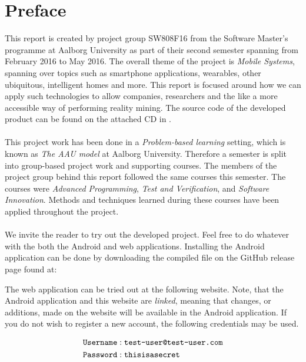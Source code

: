 
\chapter*{Preface}
This report is created by project group SW808F16 from the Software Master's programme at Aalborg University as part of their second semester spanning from February 2016 to May 2016. The overall theme of the project is \emph{Mobile Systems}, spanning over topics such as smartphone applications, wearables, other ubiquitous, intelligent homes and more. This report is focused around how we can apply such technologies to allow companies, researchers and the like a more accessible way of performing reality mining. The source code of the developed product can be found on the attached CD in .
\\\\
This project work has been done in a \emph{Problem-based learning} setting, which is known as \emph{The AAU model} at Aalborg University. Therefore a semester is split into group-based project work and supporting courses. The members of the project group behind this report followed the same courses this semester. The courses were \emph{Advanced Programming}, \emph{Test and Verification}, and \emph{Software Innovation}. Methods and techniques learned during these courses have been applied throughout the project.
\\\\
We invite the reader to try out the developed project. Feel free to do whatever with the both the Android and web applications. Installing the Android application can be done by downloading the compiled  file on the GitHub release page found at:

\begin{center}
\end{center}

The web application can be tried out at the following website. Note, that the Android application and this website are \emph{linked}, meaning that changes, or additions, made on the website will be available in the Android application. If you do not wish to register a new account, the following credentials may be used.

\begin{center}
\end{center} 

\vspace{-2em}

\begin{align*} 
\text{\texttt{Username}} &: \text{\texttt{test-user@test-user.com}} \\ 
\text{\texttt{Password}} &: \text{\texttt{thisisasecret}}
\end{align*}





